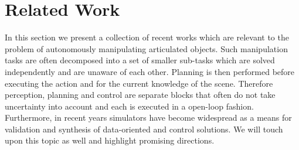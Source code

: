 \section{Related Work}
\label{sec:Related Work}


In this section we present a collection of recent works which are relevant to the problem of autonomously manipulating articulated objects. Such manipulation tasks are often decomposed into a set of smaller sub-tasks which are solved independently and are unaware of each other. Planning is then performed before executing the action and for the current knowledge of the scene. Therefore perception, planning and control are separate blocks that often do not take uncertainty into account and each is executed in a open-loop fashion. Furthermore, in recent years simulators have become widespread as a means for validation and synthesis of data-oriented and control solutions. We will touch upon this topic as well and highlight promising directions.

